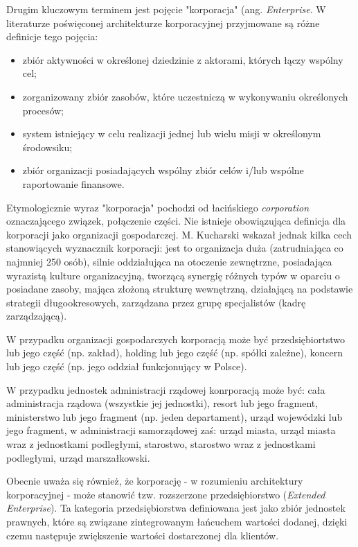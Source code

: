 Drugim kluczowym terminem jest pojęcie "korporacja" (ang. \textit{Enterprise}. W literaturze poświęconej architekturze korporacyjnej przyjmowane są różne definicje tego pojęcia:

\begin{itemize}
\item{zbiór aktywności w określonej dziedzinie z aktorami, których łączy wspólny cel;}
\item{zorganizowany zbiór zasobów, które uczestniczą w wykonywaniu określonych procesów;}
\item{system istniejący w celu realizacji jednej lub wielu misji w określonym środowsiku;}
\item{zbiór organizacji posiadających wspólny zbiór celów i/lub wspólne raportowanie finansowe.}
\end{itemize}

Etymologicznie wyraz "korporacja" pochodzi od łacińskiego \textit{corporation} oznaczającego związek, połączenie części. Nie istnieje obowiązująca definicja dla korporacji jako organizacji gospodarczej. M. Kucharski wskazał jednak kilka cech stanowiących wyznacznik korporacji: jest to organizacja duża (zatrudniająca co najmniej 250 osób), silnie oddziałująca na otoczenie zewnętrzne, posiadająca wyrazistą kulture organizacyjną, tworzącą synergię różnych typów w oparciu o posiadane zasoby, mająca złożoną strukturę wewnętrzną, działającą na podstawie strategii długookresowych, zarządzana przez grupę specjalistów (kadrę zarządzającą). 

W przypadku organizacji gospodarczych korporacją może być przedsiębiortstwo lub jego część (np. zakład), holding lub jego część (np. spółki zależne), koncern lub jego część (np. jego oddział funkcjonujący w Polsce).

W przypadku jednostek administracji rządowej konrporacją może być: cała administracja rządowa (wszystkie jej jednostki), resort lub jego fragment, ministerstwo lub jego fragment (np. jeden departament), urząd wojewódzki lub jego fragment, w administracji samorządowej zaś: urząd miasta, urząd miasta wraz z jednostkami podległymi, starostwo, starostwo wraz z jednostkami podległymi, urząd marszałkowski.

Obecnie uważa się również, że korporację - w rozumieniu architektury korporacyjnej - może stanowić tzw. rozszerzone przedsiębiorstwo (\textit{Extended Enterprise}). Ta kategoria przedsiębiorstwa definiowana jest jako zbiór jednostek prawnych, które są związane zintegrowanym łańcuchem wartości dodanej, dzięki czemu następuje zwiększenie wartości dostarczonej dla klientów.

